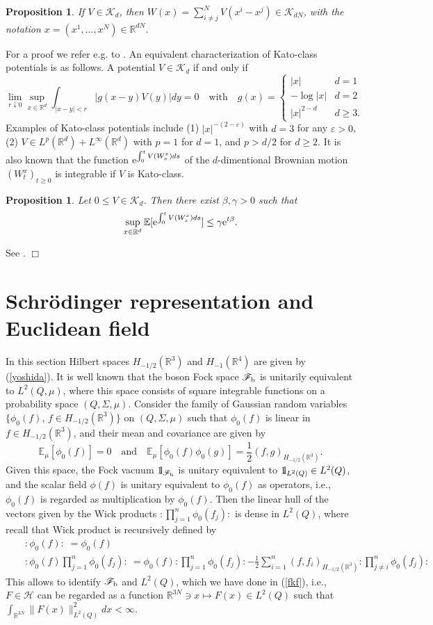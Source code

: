 \documentclass[12pt]{article}
\newtheorem{proposition}[theorem]{Proposition}
\providecommand{\bp}[1]{\begin{proposition}\label{#1}}
\providecommand{\ep}{\end{proposition}}
\def\bbbone{{\mathchoice {\rm 1\mskip-4mu l} {\rm 1\mskip-4mu l}
{\rm 1\mskip-4.5mu l} {\rm 1\mskip-5mu l}}}
\def\one{\bbbone}
\newcommand{\Ebb}{{\mathbb E}}
\providecommand{\eq}[1]{\begin{equation}\label{#1}}
\providecommand{\en}{\end{equation}}
\providecommand{\qed}{\hfill {$\Box$}\par\medskip}
\providecommand{\BR}{{\mathbb{R}^3 }}
\providecommand{\RR}{\mathbb{R}}
\providecommand{\kak}[1]{(\ref{#1})}
\providecommand{\ms}[1]{\mathscr{#1}}
\providecommand{\ffff}{{\mathscr{F}_{\rm b}}}
\providecommand{\lkk}{\left\{}
\providecommand{\half}{\frac{1}{2}}
\providecommand{\han}{{1/2}}
\providecommand{\hhh}{\ms H} %
\providecommand{\e}{{\rm e}}
\providecommand{\1}{\mathbb{1}}
\providecommand{\eps}{\varepsilon}
\begin{document}
\bp{multi}
If $V\in \ms K_d$, then $W(x)=\sum_{i\not =j}^N V(x^i-x^j) \in \ms K_{dN}$, with the notation $x=(x^1,...,x^N)
\in \RR^{dN}$.
\ep
For a proof we refer e.g. to \cite[p.7]{cfks08}. An equivalent characterization of Kato-class potentials is
as follows. A potential $V\in \ms K_d$ if and only if
\eq{eq}
\lim_{r\downarrow 0}\sup_{x\in\RR^d}\int_{|x-y|<r}|g(x-y) V(y)|dy=0 \quad \mbox{with} \quad
g(x)=\lkk \begin{array}{ll}
|x|& d=1\\
-\log|x|&d=2\\
|x|^{2-d}&d\geq 3.
\end{array}
\right.
\en
Examples of Kato-class potentials include
(1)  $|x|^{-(2-\eps)}$ with  $d=3$ for any $\eps>0$,
(2) $V\in L^p(\RR^d)+L^\infty(\RR^d)$ with $p=1$ for $d=1$, and $p>d/2$ for $d\geq 2$.
It is also known that the function $\e^{\int_0^t V(W^x_s) ds}$ of the $d$-dimentional Brownian motion $(W^x_t)_{t\ge 0}$ is integrable if $V$ is Kato-class.
\bp{expexp}
Let $0\leq V\in \ms K_d$. Then there exist $\beta, \gamma>0$ such that
\eq{alpha}
\sup_{x\in\RR^d}\Ebb[\e^{\int_0^t V(W^x_s) ds}]\le \gamma \e^{t\beta}.
\en
\ep
\proof
See \cite[Lemma 3.38]{lhb11}.
\qed

\section{Schr\"odinger representation and Euclidean field}
\label{appb}
In this section  Hilbert spaces $H_{-\han}(\RR^3)$ and
$H_{-1}(\RR^4)$
are  given by \kak{yoshida}.
It is well known that the boson Fock space $\ffff $ is unitarily equivalent to $L^2(Q,\mu)$, where this
space consists of square integrable functions on a probability space $(Q,\Sigma,\mu)$. Consider the
family of Gaussian random variables $\{\phi_0(f), \, f\in H_{-1/2}(\BR)\}$ on $(Q,\Sigma,\mu)$ such
that $\phi_0(f)$ is linear in
$f\in H_{-\han}(\RR^3)$,  and their mean and covariance are given by
$$
\Ebb_{\mu}[\phi_0(f)]=0 \quad \mbox{and} \quad \Ebb_{\mu}[\phi_0(f)\phi_0(g)]
=\half (f, g)_{H_{-\han}(\RR^3)}.
$$
Given this space, the Fock vacuum $\one_\ffff $ is unitary equivalent to $\one_{L^2(Q)}\in L^2(Q)$, and
the scalar field $\phi(f)$ is unitary equivalent to $\phi_0(f)$ as operators, i.e., $\phi_0(f)$ is
regarded as multiplication by $\phi_0(f)$. Then the linear hull of the vectors given by the Wick products
$:\prod_{j=1}^n \phi_0(f_j):$ is dense in $L^2(Q)$, where recall that Wick product is recursively defined
by
\begin{eqnarray*}
&&
{:\phi_0(f):} \; =\phi_0(f)  \\
&&
{:\phi_0(f)\prod_{j=1}^n \phi_0(f_j):} \: =
\phi_0(f):\prod_{j=1}^n \phi_0(f_j):-\half\sum_{i=1}^n (f,f_i)_{H_{-\han}(\RR^3)} :\prod_{j\not=i}^n \phi_0(f_j):
\end{eqnarray*}
This allows to identify $\ffff $ and $L^2(Q)$, which we have done in \kak{fkf}, i.e., $F\in \hhh$ can be regarded
as a function $\RR^{3N}\ni x\mapsto F(x)\in L^2(Q)$ such that $\int_{\RR^{3N}}\|F(x)\|^2_{L^2(Q)} dx<\infty$.
\end{document}

